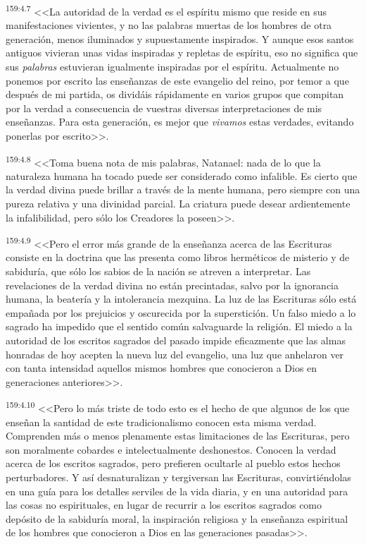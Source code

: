 \par 
\textsuperscript{159:4.7} <<La autoridad de la verdad es el espíritu mismo que reside en sus manifestaciones vivientes, y no las palabras muertas de los hombres de otra generación, menos iluminados y supuestamente inspirados. Y aunque esos santos antiguos vivieran unas vidas inspiradas y repletas de espíritu, eso no significa que sus \textit{palabras} estuvieran igualmente inspiradas por el espíritu. Actualmente no ponemos por escrito las enseñanzas de este evangelio del reino, por temor a que después de mi partida, os dividáis rápidamente en varios grupos que compitan por la verdad a consecuencia de vuestras diversas interpretaciones de mis enseñanzas. Para esta generación, es mejor que \textit{vivamos} estas verdades, evitando ponerlas por escrito>>.

\par 
\textsuperscript{159:4.8} <<Toma buena nota de mis palabras, Natanael: nada de lo que la naturaleza humana ha tocado puede ser considerado como infalible. Es cierto que la verdad divina puede brillar a través de la mente humana, pero siempre con una pureza relativa y una divinidad parcial. La criatura puede desear ardientemente la infalibilidad, pero sólo los Creadores la poseen>>.

\par 
\textsuperscript{159:4.9} <<Pero el error más grande de la enseñanza acerca de las Escrituras consiste en la doctrina que las presenta como libros herméticos de misterio y de sabiduría, que sólo los sabios de la nación se atreven a interpretar. Las revelaciones de la verdad divina no están precintadas, salvo por la ignorancia humana, la beatería y la intolerancia mezquina. La luz de las Escrituras sólo está empañada por los prejuicios y oscurecida por la superstición. Un falso miedo a lo sagrado ha impedido que el sentido común salvaguarde la religión. El miedo a la autoridad de los escritos sagrados del pasado impide eficazmente que las almas honradas de hoy acepten la nueva luz del evangelio, una luz que anhelaron ver con tanta intensidad aquellos mismos hombres que conocieron a Dios en generaciones anteriores>>.

\par 
\textsuperscript{159:4.10} <<Pero lo más triste de todo esto es el hecho de que algunos de los que enseñan la santidad de este tradicionalismo conocen esta misma verdad. Comprenden más o menos plenamente estas limitaciones de las Escrituras, pero son moralmente cobardes e intelectualmente deshonestos. Conocen la verdad acerca de los escritos sagrados, pero prefieren ocultarle al pueblo estos hechos perturbadores. Y así desnaturalizan y tergiversan las Escrituras, convirtiéndolas en una guía para los detalles serviles de la vida diaria, y en una autoridad para las cosas no espirituales, en lugar de recurrir a los escritos sagrados como depósito de la sabiduría moral, la inspiración religiosa y la enseñanza espiritual de los hombres que conocieron a Dios en las generaciones pasadas>>.


